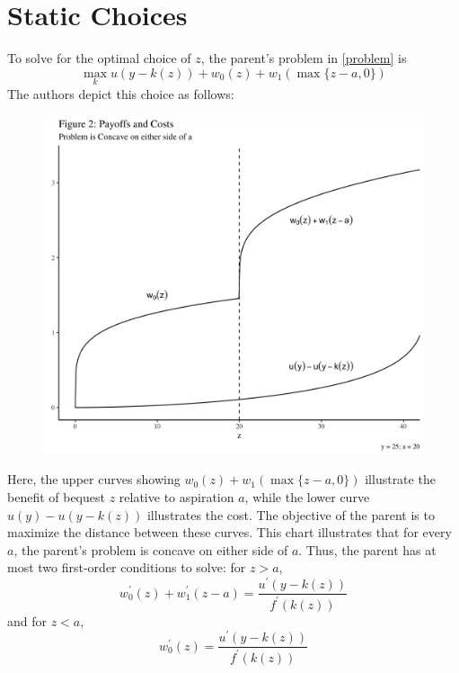 \documentclass[11pt]{article}
\begin{document}
    \section{Static Choices}
    To solve for the optimal choice of \( z \), the parent's problem in \ref{problem} is 
    \[\max_k u\left( y - k(z) \right) + w_0(z) + w_1(\max\{z - a, 0\})\]
    The authors depict this choice as follows: \newpage
    \begin{figure}[!ht]
        \centering
        \includegraphics[scale = 0.15]{figures/fig2.jpg}
    \end{figure}
    Here, the upper curves showing \( w_0(z) + w_1(\max\{z - a, 0\}) \) illustrate the benefit of bequest \( z \) relative to aspiration \( a \), while the lower curve \( u(y) - u\left( y - k(z) \right) \) illustrates the cost. The objective of the parent is to maximize the distance between these curves. This chart illustrates that for every \( a \), the parent's problem is concave on either side of \( a \). Thus, the parent has at most two first-order conditions to solve: for \( z > a \), 
    \begin{equation}
        w_0^\prime(z) + w_1^\prime(z - a) = \frac{u^\prime(y - k(z))}{f^\prime(k(z))} \label{zopt0}  
    \end{equation}
    and for \( z < a \), 
    \begin{equation}
        w_0^\prime(z) = \frac{u^\prime(y - k(z))}{f^\prime(k(z))} \label{zopt1}
    \end{equation}
\end{document}
